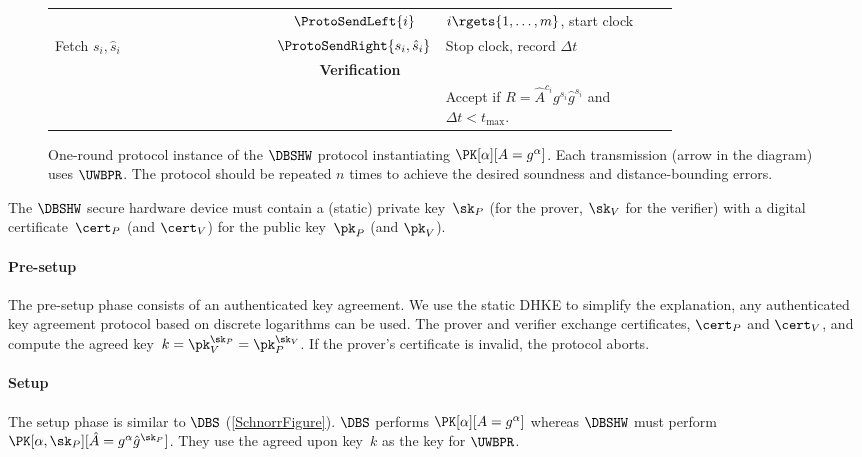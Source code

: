 \begin{figure*}
\begin{tabular}{p{0.40\linewidth}cp{0.40\linewidth}}
    & \(\ProtoSendLeft{i}\)
    & \(i\rgets \{1, \dotsc, m\}\), start clock
    \\

    Fetch \(s_i, \hat s_i\)
    & \(\ProtoSendRight{s_i, \hat s_i}\)
    & Stop clock, record \(\Delta t\)
    \\

    \midrule
    \multicolumn{3}{c}{\textbf{Verification}}
    \\

    &
    & Accept if \(R =  \hat A^{c_i} g^{s_i} \hat g^{\hat s_i}\) and \(\Delta t 
      < t_{\max}\).
    \\
    
  \end{tabular}
  \caption{%
    One-round protocol instance of the \(\DBSHW\) protocol instantiating 
    \(\PK[\alpha][A = g^\alpha]\).
    Each transmission (arrow in the diagram) uses \(\UWBPR\).
    The protocol should be repeated \(n\) times to achieve the desired 
    soundness and distance-bounding errors.
  }%
  \label{DBSHW-overview}
\end{figure*}

The \(\DBSHW\) secure hardware device must contain a (static) private 
key~\(\sk_P\) (for the prover, \(\sk_V\) for the verifier) with a digital 
certificate~\(\cert_P\) (and \(\cert_V\)) for the public key~\(\pk_P\) (and 
\(\pk_V\)).

\paragraph*{Pre-setup}

The pre-setup phase consists of an authenticated key agreement.
We use the static \ac{DHKE} to simplify the explanation, any authenticated key 
agreement protocol based on discrete logarithms can be used.
The prover and verifier exchange certificates, \(\cert_P\) and \(\cert_V\), and 
compute the agreed key~\(k = \pk_V^{\sk_P} = \pk_P^{\sk_V}\).
If the prover's certificate is invalid, the protocol aborts.

\paragraph*{Setup}

The setup phase is similar to \(\DBS\) (\cref{SchnorrFigure}).
\(\DBS\) performs \(\PK[\alpha][A = g^\alpha]\) whereas \(\DBSHW\) must perform 
\(\PK[\alpha, \sk_P][\hat A = g^\alpha \hat g^{\sk_P}]\).
They use the agreed upon key~\(k\) as the key for \(\UWBPR\).


